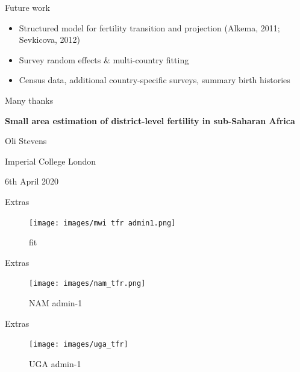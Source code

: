 \documentclass[ignorenonframetext,]{beamer}
\providecommand{\tightlist}{%
  \setlength{\itemsep}{0pt}\setlength{\parskip}{0pt}}
\begin{document}
\begin{frame}{Future work}
\protect\hypertarget{future-work}{}

\begin{itemize}
\tightlist
\item
  Structured model for fertility transition and projection (Alkema,
  2011; Sevkicova, 2012)
\item
  Survey random effects \& multi-country fitting
\item
  Census data, additional country-specific surveys, summary birth
  histories
\end{itemize}

\end{frame}

\begin{frame}{Many thanks}
\protect\hypertarget{many-thanks}{}

\textbf{Small area estimation of district-level fertility in sub-Saharan Africa}

Oli Stevens

Imperial College London

6th April 2020

\end{frame}

\begin{frame}{Extras}
\protect\hypertarget{extras}{}

\begin{figure}
\centering
\texttt{[image: images/mwi tfr admin1.png]}
\caption{fit}
\end{figure}

\end{frame}

\begin{frame}{Extras}
\protect\hypertarget{extras-1}{}

\begin{figure}
\centering
\texttt{[image: images/nam\_tfr.png]}
\caption{NAM admin-1}
\end{figure}

\end{frame}

\begin{frame}{Extras}
\protect\hypertarget{extras-2}{}

\begin{figure}
\centering
\texttt{[image: images/uga\_tfr]}
\caption{UGA admin-1}
\end{figure}

\end{frame}
\end{document}
